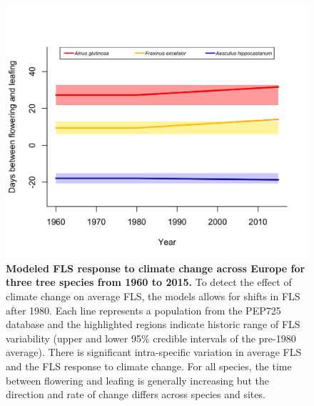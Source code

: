 \documentclass[12pt]{article}
\begin{document}
\begin{figure}[ht]
    \centering
 \includegraphics[width=\textwidth]{..//figure/FLS_climate_change.png} 
    \caption{\textbf{Modeled FLS response to climate change across Europe for three tree species from 1960 to 2015.} To detect the effect of climate change on average FLS, the models allows for shifts in FLS after 1980. Each line represents a population from the PEP725 database and the highlighted regions indicate historic range of FLS variability (upper and lower 95\% credible intervals of the pre-1980 average). There is significant intra-specific variation in average FLS and the FLS response to climate change. For all species, the time between flowering and leafing is generally increasing but the direction and rate of change differs across species and sites.}
    \label{fig:Figure 1}
\end{figure}
\end{document}
